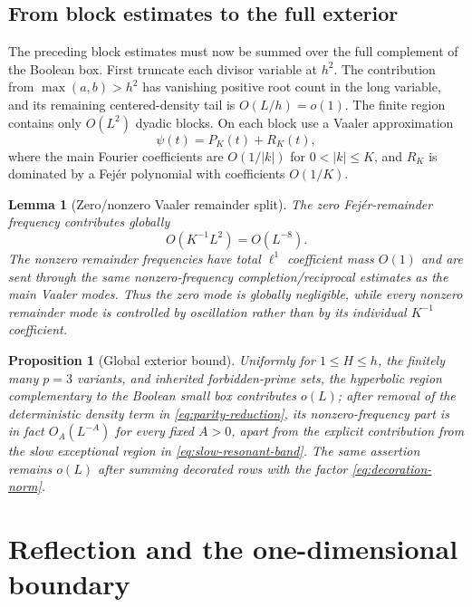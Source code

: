 \documentclass[11pt]{article}
\newtheorem{proposition}[proposition]{Proposition}
\newtheorem{lemma}[lemma]{Lemma}
\theoremstyle{definition}
\theoremstyle{remark}
\newcommand{\1}{\mathbf 1}
\begin{document}
\subsection{From block estimates to the full exterior}\label{sec:vaaler}
The preceding block estimates must now be summed over the full complement of the Boolean box.  First truncate each divisor variable at $h^2$.  The contribution from $\max(a,b)>h^2$ has vanishing positive root count in the long variable, and its remaining centered-density tail is $O(L/h)=o(1)$.  The finite region contains only $O(L^2)$ dyadic blocks.  On each block use a Vaaler approximation
\[
\psi(t)=P_K(t)+R_K(t),
\]
where the main Fourier coefficients are $O(1/|k|)$ for $0<|k|\le K$, and $R_K$ is dominated by a Fej\'er polynomial with coefficients $O(1/K)$.

\begin{lemma}[Zero/nonzero Vaaler remainder split]\label{lem:vaaler-split}
The zero Fej\'er-remainder frequency contributes globally
\begin{equation}\label{eq:vaaler-zero}
O(K^{-1}L^2)=O(L^{-8}).
\end{equation}
The nonzero remainder frequencies have total $\ell^1$ coefficient mass $O(1)$ and are sent through the same nonzero-frequency completion/reciprocal estimates as the main Vaaler modes.  Thus the zero mode is globally negligible, while every nonzero remainder mode is controlled by oscillation rather than by its individual $K^{-1}$ coefficient.
\end{lemma}

\begin{proposition}[Global exterior bound]\label{prop:exterior}
Uniformly for $1\le H\le h$, the finitely many $p=3$ variants, and inherited forbidden-prime sets, the hyperbolic region complementary to the Boolean small box contributes $o(L)$; after removal of the deterministic density term in \cref{eq:parity-reduction}, its nonzero-frequency part is in fact $O_A(L^{-A})$ for every fixed $A>0$, apart from the explicit contribution from the slow exceptional region in \cref{eq:slow-resonant-band}.  The same assertion remains $o(L)$ after summing decorated rows with the factor \cref{eq:decoration-norm}.
\end{proposition}

\section{Reflection and the one-dimensional boundary}\label{sec:one-dimensional}
\end{document}
